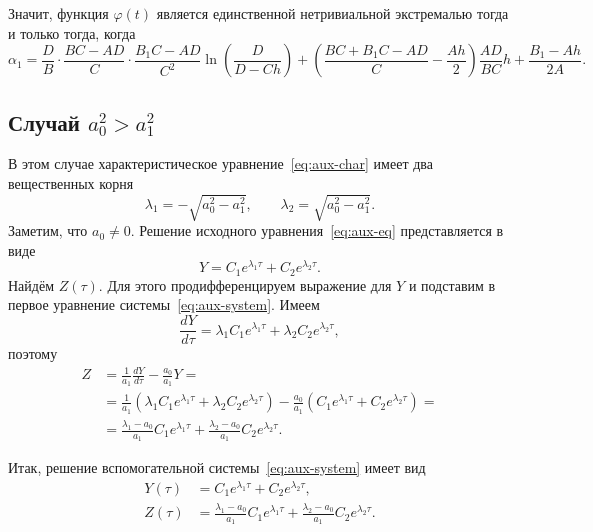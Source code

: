 \documentclass[a4paper,14pt]{article}
\begin{document}
Значит, функция $\varphi(t)$ является единственной нетривиальной экстремалью
тогда и только тогда, когда
\begin{equation*}
  \alpha_1
  =
  \frac{D}{B} \cdot
  \frac{B C - A D}{C} \cdot
  \frac{B_1 C - A D}{C^2}
  \ln \left( \frac{D}{D - C h} \right)
  +
  \left( \frac{B C + B_1 C - A D}{C} - \frac{A h }{2} \right)
  \frac{AD}{BC} h
  +
  \frac{B_1 - A h}{2 A}.
\end{equation*}

\newpage
\subsection{Случай $a_0^2 > a_1^2$}

В этом случае характеристическое уравнение~\eqref{eq:aux-char}
имеет два вещественных корня
\begin{equation*}
  \lambda_1 = - \sqrt{ a_0^2 - a_1^2 },
  \qquad
  \lambda_2 = \sqrt{ a_0^2 - a_1^2 }.
\end{equation*}
Заметим, что $a_0 \neq 0$. Решение исходного
уравнения~\eqref{eq:aux-eq} представляется в виде
\begin{equation*}
  Y = C_1 e^{\lambda_1 \tau} + C_2 e^{\lambda_2 \tau}.
\end{equation*}
Найдём $Z(\tau)$. Для этого продифференцируем выражение для $Y$
и подставим в первое уравнение системы~\eqref{eq:aux-system}.
Имеем
\begin{equation*}
  \frac{d Y}{d \tau}
  = \lambda_1 C_1 e^{\lambda_1 \tau}
  + \lambda_2 C_2 e^{\lambda_2 \tau},
\end{equation*}
поэтому
\begin{equation*}
  \begin{aligned}
    Z
    &=
      \frac{1}{a_1} \frac{d Y}{d \tau} - \frac{a_0}{a_1} Y = \\
    &=
      \frac{1}{a_1} \left(
      \lambda_1 C_1 e^{\lambda_1 \tau}
      + \lambda_2 C_2 e^{\lambda_2 \tau}
      \right)
      - \frac{a_0}{a_1} \left(
      C_1 e^{\lambda_1 \tau} + C_2 e^{\lambda_2 \tau}
      \right) = \\
    &=
      \frac{\lambda_1 - a_0}{a_1} C_1 e^{\lambda_1 \tau}
      +
      \frac{\lambda_2 - a_0}{a_1} C_2 e^{\lambda_2 \tau}.
  \end{aligned}
\end{equation*}

Итак, решение вспомогательной системы~\eqref{eq:aux-system}
имеет вид
\begin{equation}
  \label{eq:aux-system-gen-solution}
  \begin{aligned}
    Y(\tau) &= C_1 e^{\lambda_1 \tau} + C_2 e^{\lambda_2 \tau}, \\
    Z(\tau) &=
              \frac{\lambda_1 - a_0}{a_1} C_1 e^{\lambda_1 \tau}
              +
              \frac{\lambda_2 - a_0}{a_1} C_2 e^{\lambda_2 \tau}.
  \end{aligned}
\end{equation}
\end{document}
